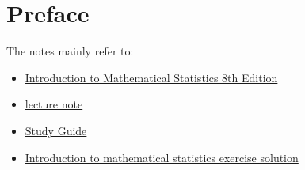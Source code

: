 \chapter*{Preface}

The notes mainly refer to:
\begin{itemize}
    \item \href{}{Introduction to Mathematical Statistics 8th Edition}
    \item \href{https://faculty.etsu.edu/gardnerr/4047/notes-Hogg-McKean-Craig.htm}{lecture note}
    \item \href{https://faculty.etsu.edu/gardnerr/4047/notes-Hogg-McKean-Craig/StudyGuide1.pdf}{Study Guide}
    \item \href{https://zhuanlan.zhihu.com/p/570096188}{Introduction to mathematical statistics exercise solution}
\end{itemize}

